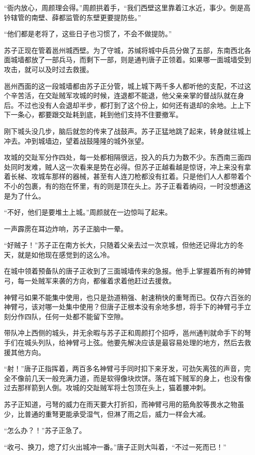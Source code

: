 “衙内放心，周颜理会得。”周颜拱着手，“我们西壁这里靠着江水近，事少。倒是高钤辖管的南壁、薛都监管的东壁更要提防些。”

“他们都是老将了，这些日子也习惯了，不会不做提防。”

苏子正现在管着邕州城西壁。为了守城，苏缄将城中兵员分做了五部，东南西北各面城墙都放了一部兵马，而剩下一部，则是通判唐子正领着。如果哪一面城墙受到攻击，就可以及时过去救援。

邕州西面的这一段城墙都由苏子正分管，城上城下两千多人都听他的支配，不过这个辛苦活，在交趾贼军攻城的时候，连退都不能退，他父亲亲掌的督战队就在身后。不过也没有人会退却半步，都打到了这个份上，如何还有退却的余地。上上下下一条心，都要跟交趾耗到底，耗到他们支持不住要撤军。

刚下城头没几步，脑后就忽的传来了战鼓声。苏子正猛地跳了起来，转身就往城上冲去。冲到城墙边，望着战鼓隆隆的城外张望。

攻城的交趾军分作四处，每一处都相隔很远，投入的兵力为数不少。东西南三面四处同时发难，贼人这一次看来是势在必得。但苏子正越看越是惊讶，冲上来没有拿着长梯、攻城车那样的器械，甚至有人连刀枪都没有扛着。只是他们人人都带着个不小的包裹，有的抱在怀里，有的则是顶在头上。苏子正看着纳闷，一时没想通这是为了什么。

“不好，他们是要堆土上城。”周颜就在一边惊叫了起来。

一声霹雳在耳边炸响，苏子正脑中一晕。

“好贼子！”苏子正在南方长大，只随着父亲去过一次京城，但他还记得北方的冬天，就是如他现在感觉到的这么冷。

在城中领着预备队的唐子正收到了三面城墙传来的急报。他手上掌握着所有的神臂弓，每一处贼军来袭的方向，都催着求着他赶过去援救。

神臂弓如果不能集中使用，也只是劲道稍强、射速稍快的重弩而已。仅存六百张的神臂弓，该对哪一处集中使用？但唐子正根本没有余地多想，将手下的神臂弓手立刻分作四队，任何一处都不能留下空隙。

带队冲上西侧的城头，并无余暇与苏子正和周颜打个招呼，邕州通判就命手下的弩手们在城头列队，给神臂弓上弦。他要先解决应该是最容易处理的地方，然后去救援其他方向。

“射！”唐子正指挥着，两百多名神臂弓手同时扣下来牙发，可劲矢离弦的声音，完全不像前几天一般充满力道，而是软得像块炊饼。落在城下贼军的身上，也没有像过去那样箭到人倒。攻城的交趾贼军将土包顶在头上，猫着腰冲刺。

苏子正知道，弓弩的威力在雨天要大打折扣，而神臂弓用的筋角胶等畏水之物虽少，比普通的重弩更能承受湿气，但淋了雨之后，威力一样会大减。

“怎么办？！”苏子正急了。

“收弓、换刀，熄了灯火出城冲一番。”唐子正则大叫着，“不过一死而已！”

